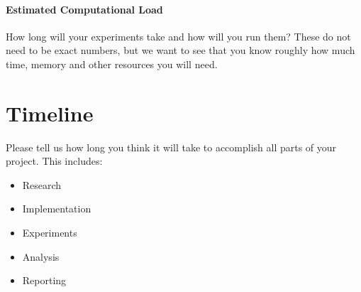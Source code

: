 \documentclass{article}
\begin{document}
\paragraph{Estimated Computational Load} How long will your experiments take and how will you run them? These do not need to be exact numbers, but we want to see that you know roughly how much time, memory and other resources you will need.

\section{Timeline}
Please tell us how long you think it will take to accomplish all parts of your project. This includes:
\begin{itemize}
    \item Research
    \item Implementation
    \item Experiments
    \item Analysis
    \item Reporting
\end{itemize}
\end{document}
